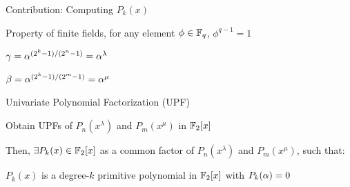 
\begin{frame}{\large Contribution: Computing $P_k(x)$}
\bi
	\vspace{0.1in}
	\item Property of finite fields, for any element $\phi \in {\mathbb{F}}_q$, $\phi^{q-1} = 1$
	\vspace{0.1in}
	\pause
	\bi
		\item $\gamma = \alpha^{(2^k-1)/(2^n-1)} = \alpha^{\lambda}$
		\item $\beta = \alpha^{(2^k-1)/(2^m-1)} = \alpha^{\mu}$
	\ei
	\pause
	\vspace{0.1in}
	\item Univariate Polynomial Factorization (UPF)
	\pause
	\vspace{0.1in}
	\bi
		\item Obtain UPFs of $P_n(x^{\lambda})$ and $P_m(x^{\mu})$ in ${\mathbb{F}}_2[x]$
	\ei
	\pause
	\vspace{0.1in}
	\item Then, $\exists P_{k}(x) \in {\mathbb{F}}_2[x]$ as a common factor of $P_n(x^{\lambda})$ and $P_m(x^{\mu})$, such that:
	\bi
		\item $P_{k}(x)$ is a degree-$k$ primitive polynomial in ${\mathbb{F}}_2[x]$ with $P_k(\alpha)=0$
	\ei
\ei
\end{frame}

